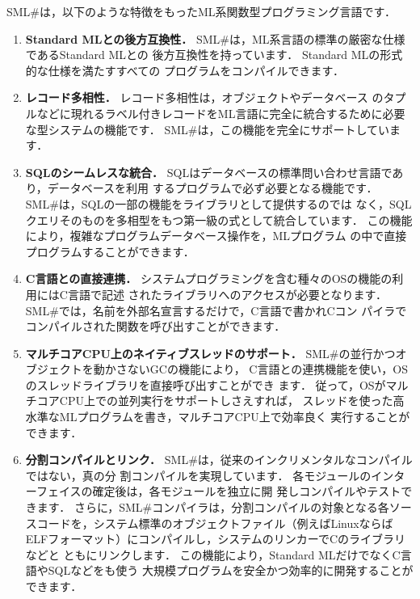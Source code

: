 \documentclass{jbook}
\newcommand{\smlsharp}{SML\#}
\begin{document}
\smlsharp{}は，以下のような特徴をもったML系関数型プログラミング言語です．
\begin{enumerate}
\item {\bf Standard MLとの後方互換性．}
	\smlsharp{}は，ML系言語の標準の厳密な仕様であるStandard MLとの
後方互換性を持っています．
	Standard MLの形式的な仕様\cite{sml}を満たすすべての
プログラムをコンパイルできます．

\item {\bf レコード多相性．}
	レコード多相性\cite{ohor95toplas}は，オブジェクトやデータベース
のタプルなどに現れるラベル付きレコードをML言語に完全に統合するために必要
な型システムの機能です．
	\smlsharp{}は，この機能を完全にサポートしています．

\item {\bf SQLのシームレスな統合．}
	SQLはデータベースの標準問い合わせ言語であり，データベースを利用
するプログラムで必ず必要となる機能です．
	\smlsharp{}は，SQLの一部の機能をライブラリとして提供するのでは
なく，SQLクエリそのものを多相型をもつ第一級の式として統合しています．
	この機能により，複雑なプログラムデータベース操作を，MLプログラム
の中で直接プログラムすることができます．
	
\item {\bf C言語との直接連携．}
	システムプログラミングを含む種々のOSの機能の利用にはC言語で記述
されたライブラリへのアクセスが必要となります．
	\smlsharp{}では，名前を外部名宣言するだけで，C言語で書かれCコン
パイラでコンパイルされた関数を呼び出すことができます．

\item {\bf マルチコアCPU上のネイティブスレッドのサポート．}
	\smlsharp{}の並行かつオブジェクトを動かさないGCの機能により，
C言語との連携機能を使い，OSのスレッドライブラリを直接呼び出すことができ
ます．
	従って，OSがマルチコアCPU上での並列実行をサポートしさえすれば，
スレッドを使った高水準なMLプログラムを書き，マルチコアCPU上で効率良く
実行することができます．

\item {\bf 分割コンパイルとリンク．}
	\smlsharp{}は，従来のインクリメンタルなコンパイルではない，真の分
割コンパイルを実現しています．
	各モジュールのインターフェイスの確定後は，各モジュールを独立に開
発しコンパイルやテストできます．
	さらに，\smlsharp{}コンパイラは，分割コンパイルの対象となる各ソー
スコードを，システム標準のオブジェクトファイル（例えばLinuxならば
ELFフォーマット）にコンパイルし，システムのリンカーでCのライブラリなどと
ともにリンクします．
	この機能により，Standard MLだけでなくC言語やSQLなどをも使う
大規模プログラムを安全かつ効率的に開発することができます．

\end{enumerate}
\end{document}
